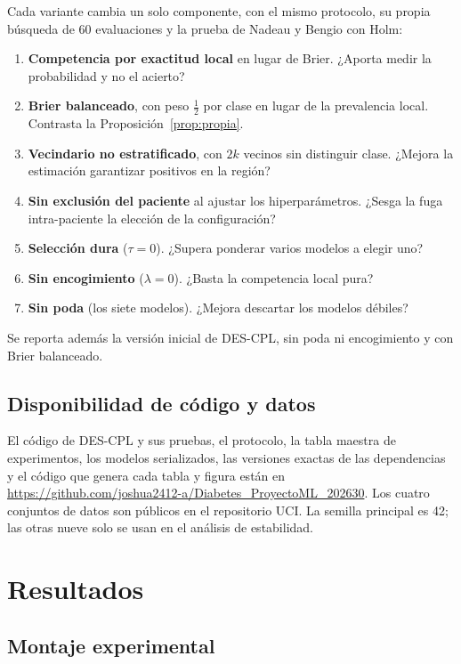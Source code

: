 \documentclass[pdflatex,sn-mathphys-num]{sn-jnl}
\theoremstyle{plain}
\begin{document}
Cada variante cambia un solo componente, con el mismo protocolo, su propia búsqueda de 60 evaluaciones y la prueba de Nadeau y Bengio con Holm:
\begin{enumerate}
\item \textbf{Competencia por exactitud local} en lugar de Brier. ¿Aporta medir la probabilidad y no el acierto?
\item \textbf{Brier balanceado}, con peso $\tfrac{1}{2}$ por clase en lugar de la prevalencia local. Contrasta la Proposición~\ref{prop:propia}.
\item \textbf{Vecindario no estratificado}, con $2k$ vecinos sin distinguir clase. ¿Mejora la estimación garantizar positivos en la región?
\item \textbf{Sin exclusión del paciente} al ajustar los hiperparámetros. ¿Sesga la fuga intra-paciente la elección de la configuración?
\item \textbf{Selección dura} ($\tau=0$). ¿Supera ponderar varios modelos a elegir uno?
\item \textbf{Sin encogimiento} ($\lambda=0$). ¿Basta la competencia local pura?
\item \textbf{Sin poda} (los siete modelos). ¿Mejora descartar los modelos débiles?
\end{enumerate}
Se reporta además la versión inicial de DES-CPL, sin poda ni encogimiento y con Brier balanceado.

\subsection{Disponibilidad de código y datos}\label{subsec:disponibilidad}

El código de DES-CPL y sus pruebas, el protocolo, la tabla maestra de experimentos, los modelos serializados, las versiones exactas de las dependencias y el código que genera cada tabla y figura están en \url{https://github.com/joshua2412-a/Diabetes_ProyectoML_202630}. Los cuatro conjuntos de datos son públicos en el repositorio UCI. La semilla principal es 42; las otras nueve solo se usan en el análisis de estabilidad.

\section{Resultados}\label{sec:resultados}

\subsection{Montaje experimental}\label{subsec:montaje}
\end{document}

